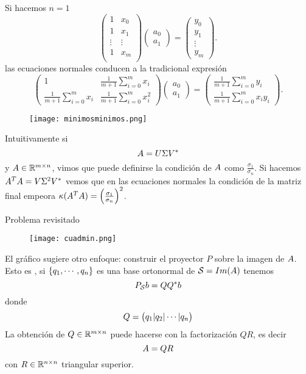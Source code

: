 Si hacemos $n=1$ 
$$
 \begin{pmatrix}
 1&x_{0}\\
 1&x_{1}\\
 \vdots&\vdots\\
 1&x_{m}\\
 \end{pmatrix}
 \begin{pmatrix}
 a_{0}\\
 a_{1}
 \end{pmatrix}=
 \begin{pmatrix}
y_{0}\\
 y_{1}\\
 \vdots\\
 y_{m}
 \end{pmatrix}.
 $$
las ecuaciones normales conducen a la tradicional expresión
$$
\begin{pmatrix}
1&\frac{1}{m+1}\sum_{i=0}^mx_i\\
\frac{1}{m+1}\sum_{i=0}^mx_i&\frac{1}{m+1}\sum_{i=0}^mx_i^2
\end{pmatrix}
\begin{pmatrix}
 a_{0}\\
 a_{1}
 \end{pmatrix}=
 \begin{pmatrix}
\frac{1}{m+1}\sum_{i=0}^my_i\\
 \frac{1}{m+1}\sum_{i=0}^mx_iy_i
 \end{pmatrix}.
$$ 

 \begin{figure}[h]
\centering\texttt{[image: minimosminimos.png]}
\end{figure}

 Intuitivamente si
 $$
 \Ab=\Ub\Sigma\Vb^*
 $$
 y $\Ab\in \R^{m\times n}$, vimos que puede definirse la condición de $\Ab$ como $\frac{\sigma_1}{\sigma_n}$. Si hacemos $\Ab^T\Ab=\Vb\Sigma^2\Vb^*$ vemos que en las ecuaciones normales la condición de la matriz final empeora $\kappa(\Ab^T\Ab)=\left(\frac{\sigma_1}{\sigma_n}\right)^2$. 

Problema revisitado
\begin{figure}[h]
\centering\texttt{[image: cuadmin.png]}
\end{figure}

El gráfico sugiere otro enfoque: construir el proyector $P$ sobre la imagen de $\Ab$. Esto es , si $\{\qb_1,\cdots,\qb_n\}$ es una base ortonormal de $\mathcal{S}=Im(\Ab)$ tenemos
$$
P_{\mathcal{S}}\bb=\Qb\Qb^*\bb
$$ 
donde 
$$
\Qb=
\begin{pmatrix}
\qb_1|\qb_2|\cdots |\qb_n
\end{pmatrix}
$$
La obtención de $\Qb\in \R^{m\times n}$ puede hacerse con la factorización $QR$, es decir
$$
\Ab=\Qb\Rb
$$
con $\Rb\in \R^{n\times n}$ triangular superior.  

